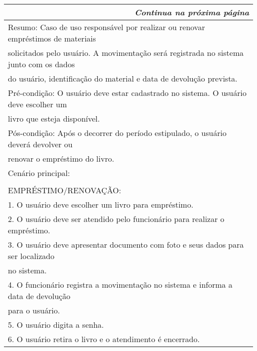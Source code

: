 \begin{longtable}{|l|}
\hline
\endfirsthead %
\hline
\hline
\hline
\endhead
\hline \multicolumn{3}{r}{\emph{Continua na próxima página}}%
\endfoot
\hline
\endlastfoot
Nome: Empréstimo ou Renovação\\ \hline
Resumo: Caso de uso responsável por realizar ou renovar empréstimos de materiais  \\ solicitados pelo usuário. A movimentação será registrada no sistema junto com os dados \\ do usuário, identificação do material e data de devolução prevista.\\ \hline
Pré-condição: O usuário deve estar cadastrado no sistema. O usuário deve escolher um \\ livro que esteja disponível.\\ \hline
Pós-condição: Após o decorrer do período estipulado, o usuário deverá devolver ou \\ renovar o empréstimo do livro.\\ \hline
Cenário principal:\\ \\ EMPRÉSTIMO/RENOVAÇÃO:\\        1. O usuário deve escolher um livro para empréstimo.\\        2. O usuário deve ser atendido pelo funcionário para realizar o empréstimo.\\        3. O usuário deve apresentar documento com foto e seus dados para ser localizado\\ no sistema. \\         4. O funcionário registra a movimentação no sistema e informa a data de devolução \\ para o usuário. \\         5. O usuário digita a senha. \\         6. O usuário retira o livro e o atendimento é encerrado. \\ \hline

\end{longtable}
